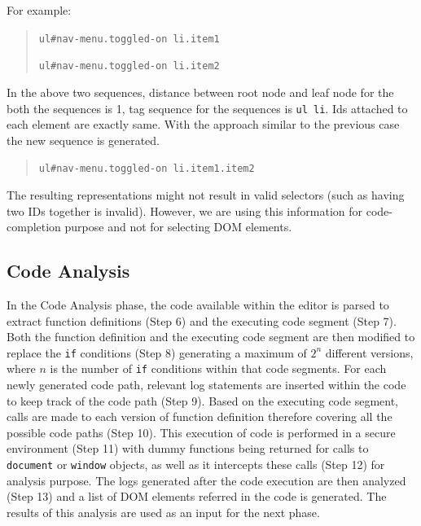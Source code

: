 \begin{description}
			For example:
			\begin{quote}
				\texttt{ul\#nav-menu.toggled-on li.item1}
	
				\texttt{ul\#nav-menu.toggled-on li.item2}
			\end{quote}

			In the above two sequences, distance between root node and leaf node for the both the sequences is 1, tag sequence for the sequences is \texttt{ul li}. Ids attached to each element are exactly same. With the approach similar to the previous case the new sequence is generated.

			\begin{quote}
				\texttt{ul\#nav-menu.toggled-on li.item1.item2}
			\end{quote}
			
			The resulting \css representations might not result in valid \css selectors (such as having two IDs together is invalid). However, we are using this information for code-completion purpose and not for selecting DOM elements.
		
		\end{description}
	
	\subsection{Code Analysis}
	\label{Sec:Code-Analysis}
		
		In the Code Analysis phase, the \javascript code available within the editor is parsed to extract function definitions (Step 6) and the executing code segment (Step 7). Both the function definition and the executing code segment are then modified to replace the \texttt{if} conditions (Step 8) generating a maximum of $2^n$ different versions, where $n$ is the number of \texttt{if} conditions within that code segments. For each newly generated code path, relevant log statements are inserted within the code to keep track of the code path (Step 9). Based on the executing code segment, calls are made to each version of function definition therefore covering all the possible code paths (Step 10). This execution of \javascript code is performed in a secure environment (Step 11) with dummy functions being returned for calls to \texttt{document} or \texttt{window} objects, as well as it intercepts these calls (Step 12) for analysis purpose. The logs generated after the code execution are then analyzed (Step 13) and a list of DOM elements referred in the code is generated. The results of this analysis are used as an input for the next phase.
		
